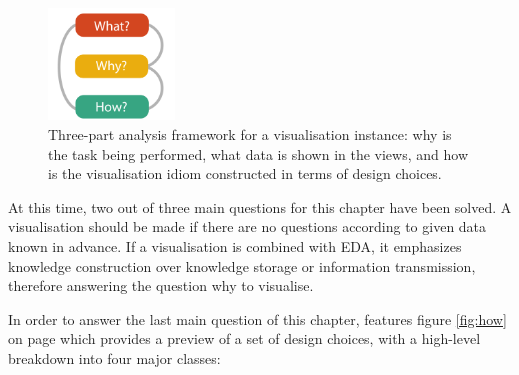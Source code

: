 \begin{figure}[!htb]
\centering
\includegraphics[width=0.3\textwidth,keepaspectratio]{images/basics/analysis-framework.png}
\caption[
    Three-part analysis framework for a visualisation instance: why is the task being performed, what data is shown in the views, and how is the visualisation idiom constructed in terms of design choices .
]{Three-part analysis framework for a visualisation instance: why is the task being performed, what data is shown in the views, and how is the visualisation idiom constructed in terms of design choices.}
\label{fig:an-framework}
\end{figure}

At this time, two out of three main questions for this chapter have been solved. A visualisation should be made if there are no questions according to given data known in advance. If a visualisation is combined with \ac{EDA}, it emphasizes knowledge construction over knowledge storage or information transmission, therefore answering the question why to visualise.

In order to answer the last main question of this chapter, \citeauthor{Munzner2014} features figure \ref{fig:how} on page \pageref{fig:how} which provides a preview of a set of design choices, with a high-level breakdown into four major classes:

